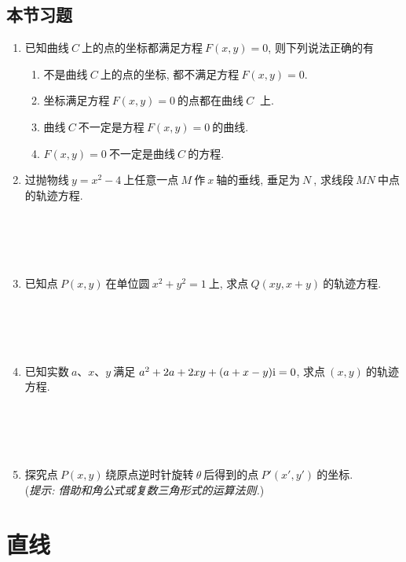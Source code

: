     \subsection{本节习题}
    \begin{enumerate}
        \item 已知曲线$\ C\ $上的点的坐标都满足方程$\ F(x,y)=0$, 则下列说法正确的有
        \begin{enumerate}
            \item 不是曲线$\ C\ $上的点的坐标, 都不满足方程$\ F(x,y)=0$.
            \item 坐标满足方程$\ F(x,y)=0\ $的点都在曲线$\ C\ $ 上.
            \item 曲线$\ C\ $不一定是方程$\ F(x,y)=0\ $的曲线.
            \item $F(x,y)=0\ $不一定是曲线$\ C\ $的方程.
        \end{enumerate}
        \item 过抛物线$\ y=x^2-4\ $上任意一点$\ M\ $作$\ x\ $轴的垂线, 垂足为$\ N\ $, 求线段$\ MN\ $中点的轨迹方程.\\ \\ \\ \\ \\
        \item 已知点$\ P(x,y)\ $在单位圆$\ x^2+y^2=1\ $上, 求点$\ Q(xy,x+y)\ $的轨迹方程.\\ \\ \\ \\ \\
        \item 已知实数$\ a$、$x$、$y\ $满足$\ a^2+2a+2xy+(a+x-y){\rm i}=0$, 求点$\ (x,y)\ $的轨迹方程.\\ \\ \\ \\ \\
        \item 探究点$\ P(x,y)\ $绕原点逆时针旋转$\ \theta\ $后得到的点$\ P'(x',y')\ $的坐标.\\
        ({\it 提示: 借助和角公式或复数三角形式的运算法则.})
    \end{enumerate}
    
    \section{直线}
